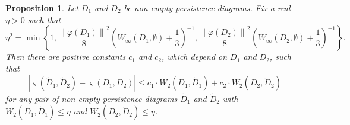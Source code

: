 \documentclass[sn-mathphys-num]{sn-jnl}%
\theoremstyle{thmstyleone}%
\newtheorem{proposition}[theorem]{Proposition}%
\theoremstyle{thmstyletwo}%
\theoremstyle{thmstylethree}%
\begin{document}
\begin{proposition}\label{proposition: continuity of cosine similarity}
	Let $D_1$ and $D_2$ be non-empty persistence diagrams. Fix a real $\eta>0$ such that
	\begin{equation*}
		\eta^2=\min \left\{1, \frac{\left\|\varphi(D_1)\right\|^2}{8}\left(W_{\infty}(D_1, \emptyset)+\frac{1}{3}\right)^{-1}, \frac{\left\|\varphi(D_2)\right\|^2}{8}\left(W_{\infty}(D_2, \emptyset)+\frac{1}{3}\right)^{-1}\right\}.
	\end{equation*}
	Then there are positive constants $c_1$ and $c_2$, which depend on $D_1$ and $D_2$, such that
	\begin{equation*}
		\left|\varsigma(\tilde{D}_1, \tilde{D}_2)-\varsigma(D_1, D_2)\right| \leq c_1 \cdot W_2(D_1, \tilde{D}_1)+c_2 \cdot W_2(D_2, \tilde{D}_2)
	\end{equation*}
	for any pair of non-empty persistence diagrams $\tilde{D}_1$ and $\tilde{D}_2$ with $W_2(D_1, \tilde{D}_1) \leq \eta$ and $W_2(D_2, \tilde{D}_2) \leq \eta$.
\end{proposition}
\end{document}
